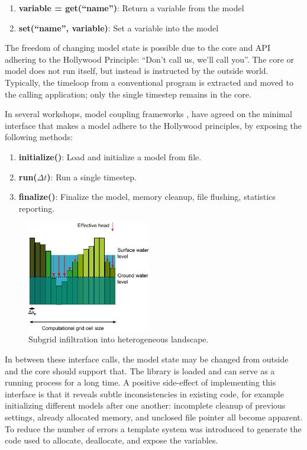 \documentclass[a4paper]{article}
\begin{document}
\begin{enumerate}
\item \textbf{variable = get(``name'')}: Return a variable from the model
\item \textbf{set(``name'', variable)}: Set a variable into the model
\end{enumerate}

The freedom of changing model state is possible due to the core and \ac{API} adhering to the Hollywood Principle: ``Don't call us, we'll call you''. The core or model does not run itself, but instead is instructed by the outside world. Typically, the timeloop from a conventional program is extracted and moved to the calling application; only the single timestep remains in the core.

In several workshops, model coupling frameworks \citep[see][for an overview]{Jagers2010}, have agreed on the minimal interface that makes a model adhere to the Hollywood principles, by exposing the following methods:

\begin{enumerate}
\item \textbf{initialize()}: Load and initialize a model from file.
\item \textbf{run($\Delta t$)}: Run a single timestep.
\item \textbf{finalize()}: Finalize the model, memory cleanup, file flushing, statistics reporting.
\end{enumerate}

\begin{figure}
  \vspace{-30pt}
  \centering
  \includegraphics[width=0.48\textwidth]{subgrid_hydrology}
  \caption{Subgrid infiltration into heterogeneous landscape.}
  \label{fig:figure2}
\end{figure}

In between these interface calls, the model state may be changed from outside and the core should support that. The library is loaded and can serve as a running process for a long time. A positive side-effect of implementing this interface is that it reveals subtle inconsistencies in existing code, for example initializing different models after one another: incomplete cleanup of previous settings, already allocated memory, and unclosed file pointer all become apparent. To reduce the number of errors a template system was introduced to generate the code used to allocate, deallocate, and expose the variables.
\end{document}
